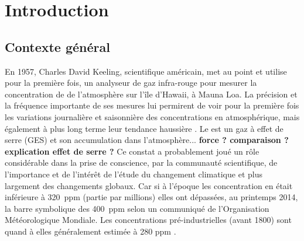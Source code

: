 
\chapter*{Introduction}
\newpage
\begin{linenumbers}


\section*{Contexte général}


En 1957, Charles David Keeling, scientifique américain, met au point et utilise pour la première fois, un analyseur de gaz infra-rouge pour mesurer la concentration de \coo de l'atmosphère sur l'île d'Hawaii, à Mauna Loa.
La précision et la fréquence importante de ses mesures lui permirent de voir pour la première fois les variations journalière et saisonnière des concentrations en \coo atmosphérique, mais également à plus long terme leur tendance haussière \cite{harris2010}.
Le \coo est un gaz à effet de serre (GES) et son accumulation dans l'atmosphère... \textbf{force ? comparaison ? explication effet de serre ?}
Ce constat a probablement joué un rôle considérable dans la prise de conscience, par la communauté scientifique, de l'importance et de l'intérêt de l'étude du changement climatique et plus largement des changements globaux.
Car si à l'époque les concentration en \coo était inférieure à 320~ppm (partie par millions) elles ont dépassées, au printemps 2014, la barre symbolique des 400~ppm selon un communiqué de l'Organisation Météorologique Mondiale. Les concentrations pré-industrielles (avant 1800) sont quand à elles généralement estimée à 280 ppm \cite{Siegenthaler1987}.


\end{linenumbers}
